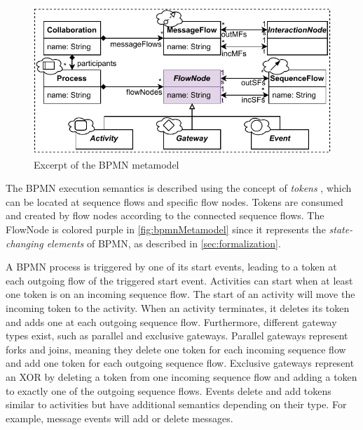 \documentclass{lmcs} %
\begin{document}
\begin{figure}[ht]
  \centering
  \includegraphics[width=0.9\linewidth]{images/bpmn_semantics-bpmn-metamodel.pdf}
  \caption{Excerpt of the BPMN metamodel \cite{objectmanagementgroupBusinessProcessModel2013}}
  \label{fig:bpmnMetamodel}
\end{figure}

The BPMN execution semantics is described using the concept of \textit{tokens} \cite{objectmanagementgroupBusinessProcessModel2013}, which can be located at sequence flows and specific flow nodes.
Tokens are consumed and created by flow nodes according to the connected sequence flows.
The \textsf{FlowNode} is colored purple in \autoref{fig:bpmnMetamodel} since it represents the \textit{state-changing elements} of BPMN, as described in \autoref{sec:formalization}.

A BPMN process is triggered by one of its start events, leading to a token at each outgoing flow of the triggered start event.
Activities can start when at least one token is on an incoming sequence flow.
The start of an activity will move the incoming token to the activity.
When an activity terminates, it deletes its token and adds one at each outgoing sequence flow.
Furthermore, different gateway types exist, such as parallel and exclusive gateways.
Parallel gateways represent forks and joins, meaning they delete one token for each incoming sequence flow and add one token for each outgoing sequence flow.
Exclusive gateways represent an XOR by deleting a token from one incoming sequence flow and adding a token to exactly one of the outgoing sequence flows.
Events delete and add tokens similar to activities but have additional semantics depending on their type.
For example, message events will add or delete messages.
\end{document}

